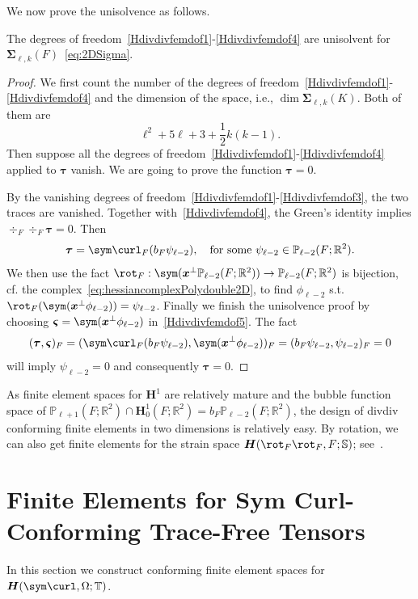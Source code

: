 We now prove the unisolvence as follows.

\begin{theorem}\label{thm:unisovlenHdivdivfem2D}
The degrees of freedom~\eqref{Hdivdivfemdof1}-\eqref{Hdivdivfemdof4} are unisolvent for $\boldsymbol \Sigma_{\ell,k}(F)$~\eqref{eq:2DSigma}.
\end{theorem}
\begin{proof}
We first count the number of the degrees of freedom~\eqref{Hdivdivfemdof1}-\eqref{Hdivdivfemdof4}  and the dimension of the space, i.e., $\dim\boldsymbol \Sigma_{\ell,k}(K)$.
Both of them are $$\ell^2+5\ell+3+\frac{1}{2}k(k-1).$$
Then suppose all the degrees of freedom~\eqref{Hdivdivfemdof1}-\eqref{Hdivdivfemdof4} applied to $\boldsymbol \tau$ vanish. We are going to prove the function $\boldsymbol \tau = 0$. 

By the vanishing degrees of freedom~\eqref{Hdivdivfemdof1}-\eqref{Hdivdivfemdof3}, the two traces are vanished. Together with~\eqref{Hdivdivfemdof4}, the Green's identity implies $\div_F\div_F \boldsymbol \tau = 0$. Then $$
\boldsymbol \tau = \sym \curl_{F}  (b_F\psi_{\ell-2}),\quad \text{for some } \psi_{\ell-2} \in \mathbb P_{\ell-2}(F;\mathbb R^2).
$$
We then use the fact $\rot_F: \sym(\boldsymbol x^{\perp}\mathbb P_{\ell-2}(F;\mathbb R^2)) \to  \mathbb P_{\ell-2}(F;\mathbb R^2)$ is bijection, cf. the complex~\eqref{eq:hessiancomplexPolydouble2D}, to find $\phi_{\ell-2}$ s.t. $\rot_F (\sym(\boldsymbol x^{\perp}\phi_{\ell-2})) = \psi_{\ell-2}$.
%
Finally we finish the unisolvence proof by choosing $\boldsymbol \varsigma = \sym (\boldsymbol x^{\perp} \phi_{\ell -2})$ in~\eqref{Hdivdivfemdof5}. The fact 
$$
(\boldsymbol \tau, \boldsymbol \varsigma)_F = (\sym\curl_F(b_F\psi_{\ell-2}),  \sym (\boldsymbol x^{\perp} \phi_{\ell -2}))_F = ( b_F\psi_{\ell-2}, \psi_{\ell-2} )_F = 0
$$
will imply $\psi_{\ell-2} = 0$ and consequently $\boldsymbol \tau = 0$.  
\end{proof}
As finite element spaces for $\boldsymbol  H^1$ are relatively mature and the bubble function space of $\mathbb P_{\ell+1}(F;\mathbb R^2)\cap \boldsymbol H_0^1(F;\mathbb R^2) = b_F\mathbb P_{\ell-2}(F;\mathbb R^2)$, the design of divdiv conforming finite elements in two dimensions is relatively easy. By rotation, we can also get finite elements for the strain space $\boldsymbol{H}(\rot_F\rot_F,F; \mathbb{S})$; see~\cite[Section 3.4]{ChenHuang2020}. 



\section{Finite Elements for Sym Curl-Conforming Trace-Free Tensors}\label{sec:tracefreefem}
In this section we construct conforming finite element spaces for $\boldsymbol{H}(\sym\curl,\Omega; \mathbb{T})$.


